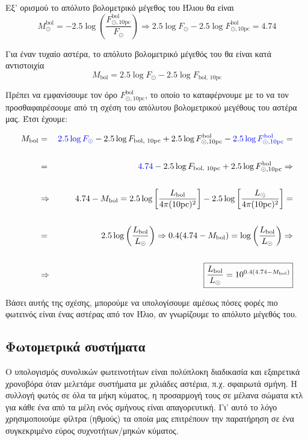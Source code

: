 Εξ' ορισμού το απόλυτο βολομετρικό μέγεθος του Ήλιου θα είναι
$$M_{\odot}^{\text{bol}} = -2.5 \log \left( \frac{F_{\odot, \text{10pc}}^{\text{bol}}}{F_{\odot}} \right) \Rightarrow 2.5 \log F_{\odot} - 2.5 \log F_{\odot, \text{10pc}}^{\text{bol}} = 4.74 $$

Για έναν τυχαίο αστέρα, το απόλυτο βολομετρικό μέγεθός του θα είναι κατά αντιστοιχία
$$M_{\text{bol}} = 2.5 \log F_{\odot} - 2.5 \log F_{\text{bol, 10pc}}$$

Πρέπει να εμφανίσουμε τον όρο $F_{\odot, \text{10pc}}^{\text{bol}}$, το οποίο το καταφέρνουμε με το να τον προσθαφαιρέσουμε από τη σχέση του απόλυτου βολομετρικού μεγέθους του αστέρα μας. Έτσι έχουμε:

\begin{eqnarray*}
    M_{\text{bol}} &=& {\color{blue} 2.5 \log F_{\odot}} - 2.5 \log F_{\text{bol, 10pc}} + 2.5 \log F_{\odot, \text{10pc}}^{\text{bol}} - {\color{blue} 2.5 \log F_{\odot, \text{10pc}}^{\text{bol}}} = \\\\
    &=& {\color{blue}4.74} - 2.5 \log F_{\text{bol, 10pc}} + 2.5 \log F_{\odot, \text{10pc}}^{\text{bol}} \Rightarrow \\\\
    &\Rightarrow & 4.74 - M_{\text{bol}} = 2.5 \log \left[ \frac{L_{\text{bol}}}{4\pi (\text{10pc})^2} \right] - 2.5 \log \left[ \frac{L_{\odot}}{4\pi (\text{10pc})^2} \right] = \\\\
    &=& 2.5 \log \left( \frac{L_{\text{bol}}}{L_{\odot}} \right) \Rightarrow 0.4(4.74 - M_{\text{bol}}) = \log \left( \frac{L_{\text{bol}}}{L_{\odot}} \right) \Rightarrow \\\\
    &\Rightarrow & \boxed{\frac{L_{\text{bol}}}{L_{\odot}} = 10^{0.4(4.74 - M_{\text{bol}})}}
\end{eqnarray*}

Βάσει αυτής της σχέσης, μπορούμε να υπολογίσουμε αμέσως πόσες φορές πιο φωτεινός είναι ένας αστέρας από τον Ήλιο, αν γνωρίζουμε το απόλυτο μέγεθός του. \\

\subsection{Φωτομετρικά συστήματα}
Ο υπολογισμός συνολικών φωτεινοτήτων είναι πολύπλοκη διαδικασία και εξαιρετικά χρονοβόρα όταν μελετάμε συστήματα με χιλιάδες αστέρια, π.χ. σφαιρωτά σμήνη. Η συλλογή φωτός σε όλα τα μήκη κύματος, η προσαρμογή τους σε μέλανα σώματα κτλ για κάθε ένα από τα μέλη ενός σμήνους είναι απαγορευτική.
Γι' αυτό το λόγο χρησιμοποιούμε φίλτρα (ηθμούς) τα οποία μας επιτρέπουν την παρατήρηση σε ένα συγκεκριμένο εύρος συχνοτήτων/μηκών κύματος.

